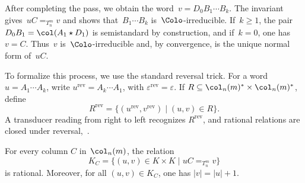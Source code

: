 \documentclass[a4paper, twoside, 11pt, english]{article}
\begin{document}
After completing the pass, we obtain the word~$v=D_0B_1\cdots B_k$.
The invariant gives~$uC=_{T_n^m}v$ and shows that~$B_1\cdots B_k$ is~$\Colo$-irreducible.
If~$k\ge1$, the pair~$D_0B_1=\col(A_1\star D_1)$ is
semistandard by construction, and if~$k=0$, one has~$v=C$.
Thus~$v$ is~$\Colo$-irreducible and, by convergence,
is the unique normal form of~$uC$.

To formalize this process, we use the standard reversal trick.
For a word~$u=A_1\cdots A_k$, write
$u^{\mathrm{rev}}=A_k\cdots A_1$, with
$\varepsilon^{\mathrm{rev}}=\varepsilon$.
If $R\subseteq \col_n(m)^*\times\col_n(m)^*$, define
\[
R^{\mathrm{rev}}
=
\{(u^{\mathrm{rev}},v^{\mathrm{rev}})\mid (u,v)\in R\}.
\]
A transducer reading from right to left recognizes
$R^{\mathrm{rev}}$, and rational relations are closed under reversal,~\cite[p.~65--66]{Ber79}.

\begin{proposition}
\label{prop:right-mult}
For every column $C$ in~$\col_n(m)$, the relation
\[
K_C=\{(u,v)\in K\times K\mid uC =_{T_n^m} v\}
\]
is rational. Moreover, for all $(u,v)\in K_C$, one has $|v|=|u|+1$.
\end{proposition}
\end{document}
